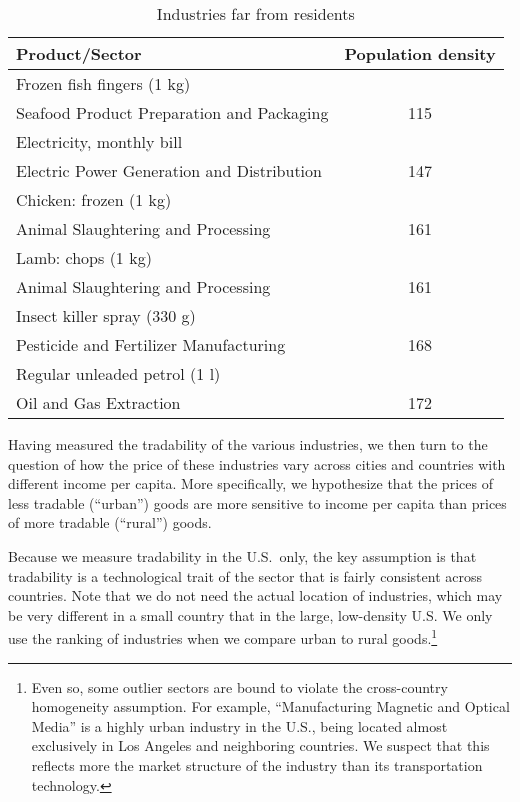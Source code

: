 \documentclass[12pt]{article}
\begin{document}
\begin{table}[ht!]
\center
\caption{Industries far from residents}
\label{tab:furthest}
\begin{tabular}{lc}
  \hline
  Product/Sector & Population density\\
  \hline
  Frozen fish fingers (1 kg)\\
  \hspace*{1em}Seafood Product Preparation and Packaging &115\\
  Electricity, monthly bill\\
  \hspace*{1em}Electric Power Generation and Distribution & 147\\
  Chicken: frozen (1 kg)\\
  \hspace*{1em}Animal Slaughtering and Processing & 161\\
  Lamb: chops (1 kg)\\
  \hspace*{1em}Animal Slaughtering and Processing & 161\\
  Insect killer spray (330 g)\\
  \hspace*{1em}Pesticide and Fertilizer Manufacturing & 168\\
  Regular unleaded petrol (1 l)\\
  \hspace*{1em}Oil and Gas Extraction & 172\\
  \hline
\end{tabular}
\end{table}

\bigskip

Having measured the tradability of the various industries, we then turn to the question of how the price of these industries vary across cities and countries with different income per capita. More specifically, we hypothesize that the prices of less tradable (``urban'') goods are more sensitive to income per capita than prices of more tradable (``rural'') goods. 

Because we measure tradability in the U.S.~only, the key assumption is that tradability is a technological trait of the sector that is fairly consistent across countries. Note that we do not need the actual location of industries, which may be very different in a small country that in the large, low-density U.S. We only use the ranking of industries when we compare urban to rural goods.\footnote{Even so, some outlier sectors are bound to violate the cross-country homogeneity assumption. For example, ``Manufacturing Magnetic and Optical Media'' is a highly urban industry in the U.S., being located almost exclusively in Los Angeles and neighboring countries. We suspect that this reflects more the market structure of the industry than its transportation technology.}
\end{document}
